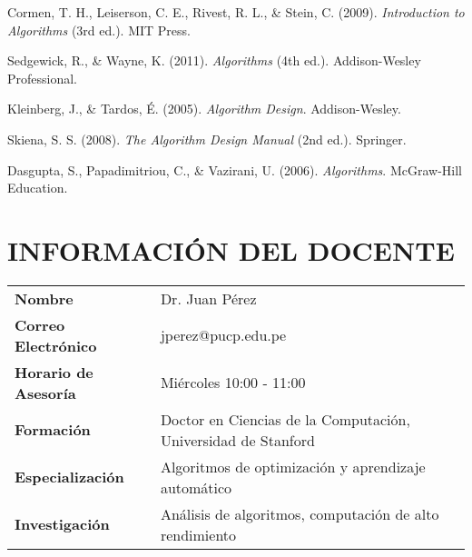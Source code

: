 \documentclass[12pt,a4paper]{article}
\begin{document}
\begin{bibliografiaCurso}
    \item Cormen, T. H., Leiserson, C. E., Rivest, R. L., \& Stein, C. (2009). \textit{Introduction to Algorithms} (3rd ed.). MIT Press.
    \item Sedgewick, R., \& Wayne, K. (2011). \textit{Algorithms} (4th ed.). Addison-Wesley Professional.
    \item Kleinberg, J., \& Tardos, É. (2005). \textit{Algorithm Design}. Addison-Wesley.
    \item Skiena, S. S. (2008). \textit{The Algorithm Design Manual} (2nd ed.). Springer.
    \item Dasgupta, S., Papadimitriou, C., \& Vazirani, U. (2006). \textit{Algorithms}. McGraw-Hill Education.
\end{bibliografiaCurso}

\section{INFORMACIÓN DEL DOCENTE}

\begin{tcolorbox}[colback=white,colframe=pucpAzul,title=\textbf{Perfil del Docente}]
\begin{minipage}{0.25\textwidth}
  \centering
\end{minipage}%
\begin{minipage}{0.75\textwidth}
  \begin{tabularx}{\textwidth}{>{\color{pucpGris}\bfseries}l X}
    Nombre & Dr. Juan Pérez \\
    Correo Electrónico & jperez@pucp.edu.pe \\
    Horario de Asesoría & Miércoles 10:00 - 11:00 \\
    Formación & Doctor en Ciencias de la Computación, Universidad de Stanford \\
    Especialización & Algoritmos de optimización y aprendizaje automático \\
    Investigación & Análisis de algoritmos, computación de alto rendimiento \\
  \end{tabularx}
\end{minipage}
\end{tcolorbox}
\vspace{0.5cm}
\end{document}
